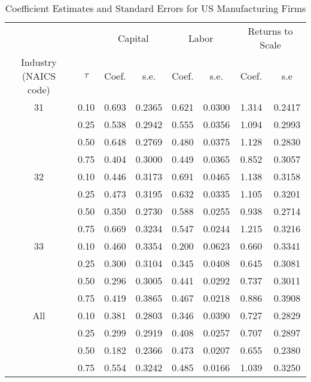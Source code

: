 \begin{table}[ht]
\centering
\caption{Coefficient Estimates and Standard Errors for US Manufacturing Firms} 
\begin{tabular}{cccccccc}
  \hline\hline & & \multicolumn{2}{c}{Capital}  & \multicolumn{2}{c}{Labor} & \multicolumn{2}{c}{Returns to Scale} \\ \cmidrule(lr){3-4} \cmidrule(lr){5-6} \cmidrule(lr){7-8}Industry (NAICS code) & $\tau$ & Coef. & s.e. & Coef. & s.e. & Coef. & s.e \\ 
  \hline
31 & 0.10 & 0.693 & 0.2365 & 0.621 & 0.0300 & 1.314 & 0.2417 \\ 
   & 0.25 & 0.538 & 0.2942 & 0.555 & 0.0356 & 1.094 & 0.2993 \\ 
   & 0.50 & 0.648 & 0.2769 & 0.480 & 0.0375 & 1.128 & 0.2830 \\ 
   & 0.75 & 0.404 & 0.3000 & 0.449 & 0.0365 & 0.852 & 0.3057 \\ 
  32 & 0.10 & 0.446 & 0.3173 & 0.691 & 0.0465 & 1.138 & 0.3158 \\ 
   & 0.25 & 0.473 & 0.3195 & 0.632 & 0.0335 & 1.105 & 0.3201 \\ 
   & 0.50 & 0.350 & 0.2730 & 0.588 & 0.0255 & 0.938 & 0.2714 \\ 
   & 0.75 & 0.669 & 0.3234 & 0.547 & 0.0244 & 1.215 & 0.3216 \\ 
  33 & 0.10 & 0.460 & 0.3354 & 0.200 & 0.0623 & 0.660 & 0.3341 \\ 
   & 0.25 & 0.300 & 0.3104 & 0.345 & 0.0408 & 0.645 & 0.3081 \\ 
   & 0.50 & 0.296 & 0.3005 & 0.441 & 0.0292 & 0.737 & 0.3011 \\ 
   & 0.75 & 0.419 & 0.3865 & 0.467 & 0.0218 & 0.886 & 0.3908 \\ 
  All & 0.10 & 0.381 & 0.2803 & 0.346 & 0.0390 & 0.727 & 0.2829 \\ 
   & 0.25 & 0.299 & 0.2919 & 0.408 & 0.0257 & 0.707 & 0.2897 \\ 
   & 0.50 & 0.182 & 0.2366 & 0.473 & 0.0207 & 0.655 & 0.2380 \\ 
   & 0.75 & 0.554 & 0.3242 & 0.485 & 0.0166 & 1.039 & 0.3250 \\ 
   \hline
\end{tabular}
\end{table}
